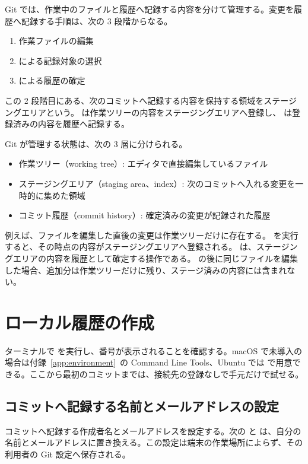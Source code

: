 Git では、作業中のファイルと履歴へ記録する内容を分けて管理する。変更を履歴へ記録する手順は、次の 3 段階からなる。

\begin{enumerate}
\item 作業ファイルの編集
\item {} による記録対象の選択
\item {} による履歴の確定
\end{enumerate}

この 2 段階目にある、次のコミットへ記録する内容を保持する領域をステージングエリアという。 は作業ツリーの内容をステージングエリアへ登録し、 は登録済みの内容を履歴へ記録する。

Git が管理する状態は、次の 3 層に分けられる。

\begin{itemize}
\item 作業ツリー（working tree）: エディタで直接編集しているファイル
\item ステージングエリア（staging area、index）: 次のコミットへ入れる変更を一時的に集めた領域
\item コミット履歴（commit history）: 確定済みの変更が記録された履歴
\end{itemize}

例えば、ファイルを編集した直後の変更は作業ツリーだけに存在する。 を実行すると、その時点の内容がステージングエリアへ登録される。 は、ステージングエリアの内容を履歴として確定する操作である。 の後に同じファイルを編集した場合、追加分は作業ツリーだけに残り、ステージ済みの内容には含まれない。

\section{ローカル履歴の作成}

ターミナルで  を実行し、番号が表示されることを確認する。macOS で未導入の場合は付録~\ref{app:environment}~の Command Line Tools、Ubuntu では  で用意できる。ここから最初のコミットまでは、接続先の登録なしで手元だけで試せる。

\subsection{コミットへ記録する名前とメールアドレスの設定}

コミットへ記録する作成者名とメールアドレスを設定する。次の  と  は、自分の名前とメールアドレスに置き換える。この設定は端末の作業場所によらず、その利用者の Git 設定へ保存される。

